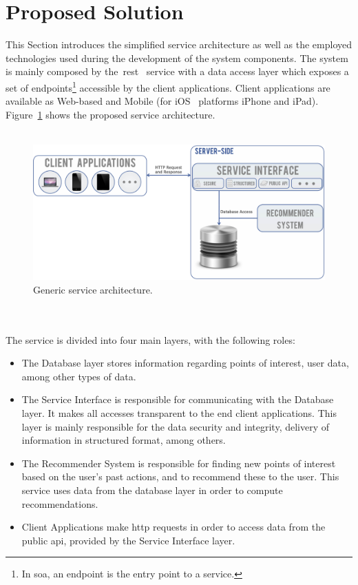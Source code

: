 \section{Proposed Solution}
\label{sec:ftbd}
This Section introduces the simplified service architecture as well as the employed technologies used during the development of the system components. The system is mainly composed by the~\gls{rest}~\cite{RestWebber} service with a data access layer which exposes a set of endpoints\footnote{In \gls{soa}, an endpoint is the entry point to a service.} accessible by the client applications. Client applications are available as Web-based and Mobile (for iOS~\cite{ios} platforms iPhone and iPad). Figure~\ref{fig:introductioArchitecture} shows the proposed service architecture.\\
\\
\begin{figure}[h!]
 \centering
   \includegraphics[width=14.8 cm]{./images/diagrams/diagram_introduction_architecture.jpg}
   \caption{Generic service architecture.}
   \label{fig:introductioArchitecture}
\end{figure}\\
\\
The service is divided into four main layers, with the following roles:
\begin{itemize}
 \item The Database layer stores information regarding points of interest, user data, among other types of data.
 \item The Service Interface is responsible for communicating with the Database layer. It makes all accesses transparent to the end client applications. This layer is mainly responsible for the data security and integrity, delivery of information in structured format, among others.
 \item The Recommender System is responsible for finding new points of interest based on the user's past actions, and to recommend these to the user. This service uses data from the database layer in order to compute recommendations.
 \item Client Applications make \gls{http} requests in order to access data from the public \gls{api}, provided by the Service Interface layer.
\end{itemize}

